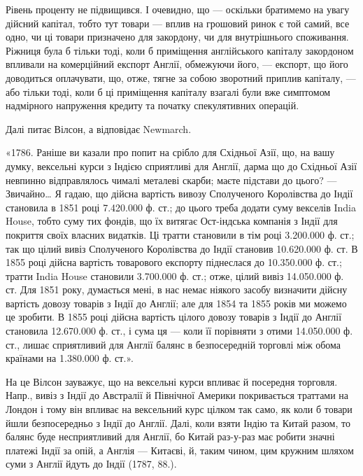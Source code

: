 \parcont{}  %
Рівень проценту не підвищився. І очевидно, що — оскільки братимемо на увагу
дійсний капітал, тобто тут товари — вплив на грошовий ринок є той самий,
все одно, чи ці товари призначено для закордону, чи для внутрішнього споживання.
Ріжниця була б тільки тоді, коли б приміщення англійського капіталу
закордоном впливали на комерційний експорт Англії, обмежуючи його, — експорт,
що його доводиться оплачувати, що, отже, тягне за собою зворотний приплив
капіталу, — або тільки тоді, коли б ці приміщення капіталу взагалі були вже
симптомом надмірного напруження кредиту та початку спекулятивних операцій.

Далі питає Вілсон, а відповідає Newmarch.

«1786. Раніше ви казали про попит на срібло для Східньої Азії, що, на
вашу думку, вексельні курси з Індією сприятливі для Англії, дарма що до Східньої
Азії невпинно відправлялось чималі металеві скарби; маєте підстави до цього? —
Звичайно\dots{} Я гадаю, що дійсна вартість вивозу Сполученого Королівства до
Індії становила в 1851 році \num{7.420.000} ф. ст.; до цього треба додати суму
векселів India House, тобто суму тих фондів, що їх витягає Ост-індська компанія
з Індії для покриття своїх власних видатків. Ці тратти становили в тім році
\num{3.200.000} ф. ст.; так що цілий вивіз Сполученого Королівства до Індії становив
\num{10.620.000} ф. ст. В 1855 році дійсна вартість товарового експорту піднеслася
до \num{10.350.000} ф. ст.; тратти India House становили \num{3.700.000} ф. ст.;
отже, цілий вивіз \num{14.050.000} ф. ст. Для 1851 року, думається мені, в нас немає
ніякого засобу визначити дійсну вартість довозу товарів з Індії до Англії; але
для 1854 та 1855 років ми можемо це зробити. В 1855 році дійсна вартість
цілого довозу товарів з Індії до Англії становила \num{12.670.000} ф. ст., і сума ця —
коли її порівняти з отими \num{14.050.000} ф. ст., лишає сприятливий для Англії
балянс в безпосередній торговлі між обома країнами на \num{1.380.000} ф. ст.».

На це Вілсон зауважує, що на вексельні курси впливає й посередня торговля.
Напр., вивіз з Індії до Австралії й Північної Америки покривається траттами
на Лондон і тому він впливає на вексельний курс цілком так само, як
коли б товари йшли безпосередньо з Індії до Англії. Далі, коли взяти Індію та
Китай разом, то балянс буде несприятливий для Англії, бо Китай раз-у-раз
має робити значні платежі Індії за опій, а Англія — Китаєві, й, таким чином, цим
кружним шляхом суми з Англії йдуть до Індії (1787, 88.).

